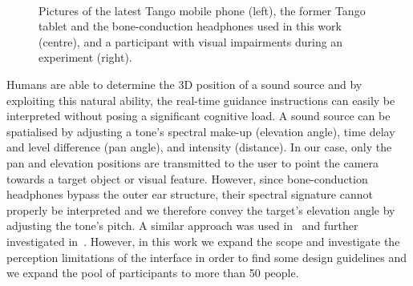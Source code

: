 \documentclass{article}
\begin{document}
\begin{figure}[t]
  \centering
~
~
  \caption{Pictures of the latest Tango mobile phone (left), the former Tango tablet and the bone-conduction headphones used in this work (centre), and a participant with visual impairments during an experiment (right).}
\end{figure}

Humans are able to determine the 3D position of a sound source and by exploiting this natural ability, the real-time guidance instructions can easily be interpreted without posing a significant cognitive load.
A sound source can be spatialised by adjusting a tone's spectral make-up (elevation angle), time delay and level difference (pan angle), and intensity (distance).
In our case, only the pan and elevation positions are transmitted to the user to point the camera towards a target object or visual feature.
However, since bone-conduction headphones bypass the outer ear structure, their spectral signature cannot properly be interpreted and we therefore convey the target's elevation angle by adjusting the tone's pitch.
A similar approach was used in~\cite{durette2008visuo} and further investigated in~\cite{lock2019bone}.
However, in this work we expand the scope and investigate the perception limitations of the interface in order to find some design guidelines and we expand the pool of participants to more than 50 people.
\end{document}
